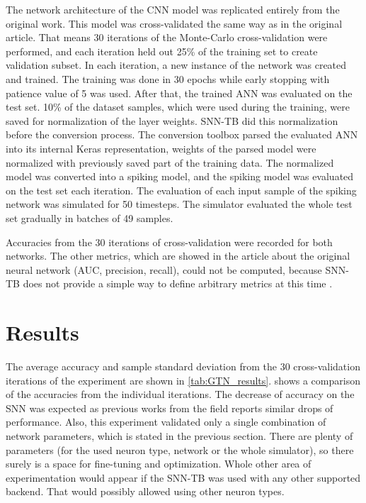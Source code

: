 The network architecture of the CNN model was replicated entirely from the original work. This model was cross-validated the same way as in the original article. That means 30 iterations of the Monte-Carlo cross-validation were performed, and each iteration held out 25\% of the training set to create validation subset. In each iteration, a new instance of the network was created and trained. The training was done in 30 epochs while early stopping with patience value of 5 was used. After that, the trained ANN was evaluated on the test set. 10\% of the dataset samples, which were used during the training, were saved for normalization of the layer weights. SNN-TB did this normalization before the conversion process. The conversion toolbox parsed the evaluated ANN into its internal Keras representation, weights of the parsed model were normalized with previously saved part of the training data. The normalized model was converted into a spiking model, and the spiking model was evaluated on the test set each iteration. The evaluation of each input sample of the spiking network was simulated for 50 timesteps. The simulator evaluated the whole test set gradually in batches of 49 samples. \par
Accuracies from the 30 iterations of cross-validation were recorded for both networks. The other metrics, which are showed in the article about the original neural network (AUC, precision, recall), could not be computed, because SNN-TB does not provide a simple way to define arbitrary metrics at this time \footnotemark.


\section{Results}
The average accuracy and sample standard deviation from the 30 cross-validation iterations of the experiment are shown in \cref{tab:GTN_results}.  shows a comparison of the accuracies from the individual iterations. The decrease of accuracy on the SNN was expected as previous works from the field reports similar drops of performance. Also, this experiment validated only a single combination of network parameters, which is stated in the previous section. There are plenty of parameters (for the used neuron type, network or the whole simulator), so there surely is a space for fine-tuning and optimization. Whole other area of experimentation would appear if the SNN-TB was used with any other supported backend. That would possibly allowed using other neuron types.

